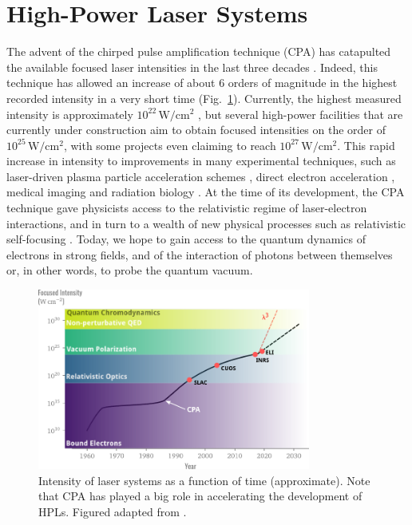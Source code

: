 \documentclass[11pt,SymmetricalJury]{inrsthesis/inrsthesis}
\begin{document}
\section{High-Power Laser Systems}

The advent of the chirped pulse amplification technique (CPA) has catapulted the
available focused laser intensities in the last three decades \cite{Mourou2006}.
Indeed, this technique has allowed an increase of about 6 orders of magnitude in
the highest recorded intensity in a very short time
(Fig.~\ref{fig:intro.intensity-history}). Currently, the highest measured
intensity is approximately $10^{22}\,\si{\watt\per\cm\squared}$ \cite{Bahk2005},
but several high-power facilities that are currently under construction aim to
obtain focused intensities on the order of $10^{25}\,\si{\watt\per\cm\squared}$,
with some projects even claiming to reach $10^{27}\,\si{\watt\per\cm\squared}$.
This rapid increase in intensity to improvements in many
experimental techniques, such as laser-driven plasma particle acceleration
schemes \cite{Esarey2009}, direct electron acceleration
\cite{Salamin2008,Marceau2013a}, medical imaging and radiation biology \cite[and
references therein]{Danson2015,Malka2008}. At the time of its development, the CPA technique
gave physicists access to the relativistic regime of laser-electron interactions,
and in turn to a wealth of new physical processes such as relativistic self-focusing
\cite{}. Today, we hope to gain access to the quantum dynamics of electrons in strong
fields, and of the interaction of photons between themselves or, in other words,
to probe the quantum vacuum.


\begin{figure}
  \centering
  \includegraphics[width=0.8\textwidth]{figs/IntensityHistory.pdf}
  \caption[Short history of the intensity of laser systems.]
          {Intensity of laser systems as a function of time (approximate).
           Note that CPA has played a big role in accelerating the development
           of HPLs.
           Figured adapted from \cite{Mourou2015}.}
  \label{fig:intro.intensity-history}
\end{figure}
\end{document}
